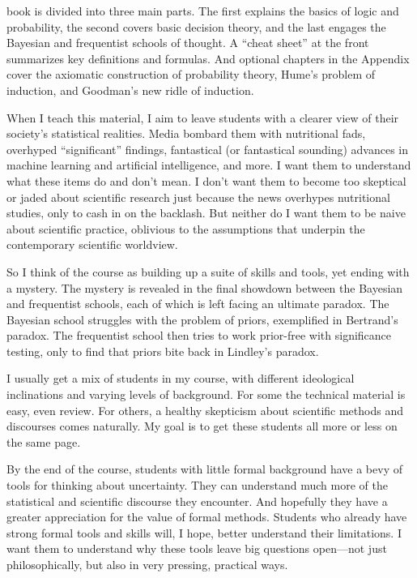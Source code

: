 \documentclass[justified]{tufte-book}
\theoremstyle{definition}
\theoremstyle{definition}
\theoremstyle{definition}
\theoremstyle{remark}
\begin{document}
 book is divided into three main parts. The first
explains the basics of logic and probability, the second covers basic
decision theory, and the last engages the Bayesian and frequentist
schools of thought. A ``cheat sheet'' at the front summarizes key
definitions and formulas. And optional chapters in the Appendix cover
the axiomatic construction of probability theory, Hume's problem of
induction, and Goodman's new ridle of induction.

When I teach this material, I aim to leave students with a clearer view
of their society's statistical realities. Media bombard them with
nutritional fads, overhyped ``significant'' findings, fantastical (or
fantastical sounding) advances in machine learning and artificial
intelligence, and more. I want them to understand what these items do
and don't mean. I don't want them to become too skeptical or jaded about
scientific research just because the news overhypes nutritional studies,
only to cash in on the backlash. But neither do I want them to be naive
about scientific practice, oblivious to the assumptions that underpin
the contemporary scientific worldview.

So I think of the course as building up a suite of skills and tools, yet
ending with a mystery. The mystery is revealed in the final showdown
between the Bayesian and frequentist schools, each of which is left
facing an ultimate paradox. The Bayesian school struggles with the
problem of priors, exemplified in Bertrand's paradox. The frequentist
school then tries to work prior-free with significance testing, only to
find that priors bite back in Lindley's paradox.

I usually get a mix of students in my course, with different ideological
inclinations and varying levels of background. For some the technical
material is easy, even review. For others, a healthy skepticism about
scientific methods and discourses comes naturally. My goal is to get
these students all more or less on the same page.

By the end of the course, students with little formal background have a
bevy of tools for thinking about uncertainty. They can understand much
more of the statistical and scientific discourse they encounter. And
hopefully they have a greater appreciation for the value of formal
methods. Students who already have strong formal tools and skills will,
I hope, better understand their limitations. I want them to understand
why these tools leave big questions open---not just philosophically, but
also in very pressing, practical ways.
\end{document}
